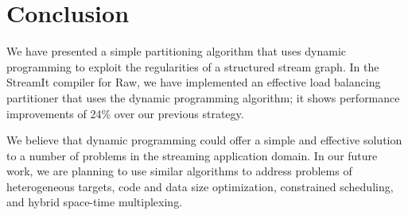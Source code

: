 \section{Conclusion}

We have presented a simple partitioning algorithm that uses dynamic
programming to exploit the regularities of a structured stream graph.
In the StreamIt compiler for Raw, we have implemented an effective
load balancing partitioner that uses the dynamic programming
algorithm; it shows performance improvements of 24\% over our previous
strategy.  

We believe that dynamic programming could offer a simple and effective
solution to a number of problems in the streaming application domain.
In our future work, we are planning to use similar algorithms to
address problems of heterogeneous targets, code and data size
optimization, constrained scheduling, and hybrid space-time
multiplexing.
